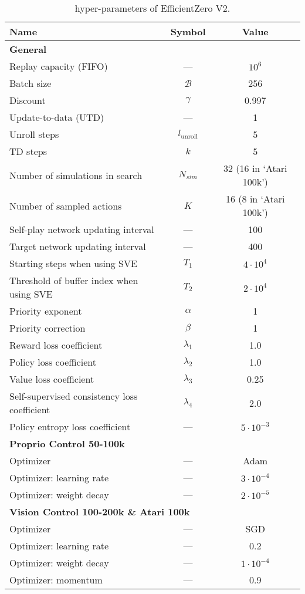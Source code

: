 \begin{table}[h!]
\centering
\begin{tabular}{lcc}
\toprule
\textbf{Name} & \textbf{Symbol} & \textbf{Value} \\
\midrule
\multicolumn{3}{l}{\textbf{General}} \\
\midrule
Replay capacity (FIFO) & --- & $10^6\!\!$ \\
Batch size & $\mathcal{B}$ & 256 \\
Discount & $\gamma$ & 0.997\\
Update-to-data (UTD)  & --- & 1 \\
Unroll steps & $l_{\text{unroll}}$ & 5 \\
TD steps & $k$ & 5 \\
Number of simulations in search & $N_{sim}$ & 32 (16 in `Atari 100k') \\
Number of sampled actions & $K$ & 16 (8 in `Atari 100k')\\
Self-play network updating interval & --- & 100 \\
Target network updating interval & --- & 400 \\
Starting steps when using SVE & $T_1$ & $4\cdot10^{4}$ \\
Threshold of buffer index when using SVE & $T_2$ & $2\cdot10^{4}$ \\
Priority exponent & $\alpha$ & 1 \\
Priority correction & $\beta$ & 1 \\
Reward loss coefficient  & $\lambda_1$ & 1.0 \\
Policy loss coefficient  & $\lambda_2$ & 1.0 \\
Value loss coefficient & $\lambda_3$ & 0.25 \\
Self-supervised consistency loss coefficient & $\lambda_4$ & 2.0 \\
Policy entropy loss coefficient  & --- & $5\cdot10^{-3}$ \\
\midrule
\multicolumn{3}{l}{\textbf{Proprio Control 50-100k }} \\
\midrule
Optimizer & --- & Adam \\
Optimizer: learning rate & --- & $3\cdot10^{-4}$ \\
Optimizer: weight decay & --- & $2\cdot10^{-5}$ \\
\midrule
\multicolumn{3}{l}{\textbf{Vision Control 100-200k \& Atari 100k}} \\
\midrule
Optimizer & --- & SGD \\
Optimizer: learning rate & --- & 0.2 \\
Optimizer: weight decay & --- & $1\cdot10^{-4}$ \\
Optimizer: momentum & --- & 0.9 \\
\bottomrule

\end{tabular}
\caption{hyper-parameters of EfficientZero V2.
}
\label{tab:hparams}
\end{table}

